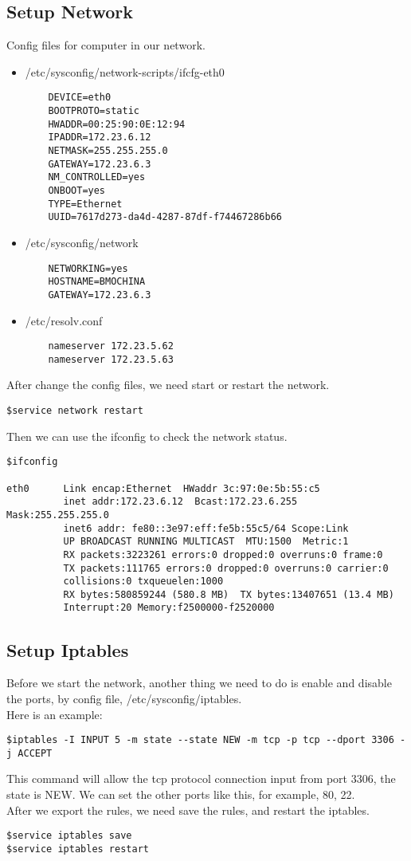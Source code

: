 \documentclass{article}
\begin{document}
\subsection{Setup Network}
Config files for computer in our network.
\begin{itemize}
    \item
    /etc/sysconfig/network-scripts/ifcfg-eth0
    \begin{lstlisting}
    DEVICE=eth0
    BOOTPROTO=static
    HWADDR=00:25:90:0E:12:94
    IPADDR=172.23.6.12
    NETMASK=255.255.255.0
    GATEWAY=172.23.6.3
    NM_CONTROLLED=yes
    ONBOOT=yes
    TYPE=Ethernet
    UUID=7617d273-da4d-4287-87df-f74467286b66
    \end{lstlisting}
    \item
    /etc/sysconfig/network
    \begin{lstlisting}
    NETWORKING=yes
    HOSTNAME=BMOCHINA
    GATEWAY=172.23.6.3
    \end{lstlisting}
    \item
    /etc/resolv.conf
    \begin{lstlisting}
    nameserver 172.23.5.62
    nameserver 172.23.5.63
    \end{lstlisting}
\end{itemize}
After change the config files, we need start or restart the network.
\begin{lstlisting}
$service network restart
\end{lstlisting}
Then we can use the ifconfig to check the network status.
\begin{lstlisting}
$ifconfig

eth0      Link encap:Ethernet  HWaddr 3c:97:0e:5b:55:c5  
          inet addr:172.23.6.12  Bcast:172.23.6.255  Mask:255.255.255.0
          inet6 addr: fe80::3e97:eff:fe5b:55c5/64 Scope:Link
          UP BROADCAST RUNNING MULTICAST  MTU:1500  Metric:1
          RX packets:3223261 errors:0 dropped:0 overruns:0 frame:0
          TX packets:111765 errors:0 dropped:0 overruns:0 carrier:0
          collisions:0 txqueuelen:1000 
          RX bytes:580859244 (580.8 MB)  TX bytes:13407651 (13.4 MB)
          Interrupt:20 Memory:f2500000-f2520000 
\end{lstlisting}

\subsection{Setup Iptables}
Before we start the network, another thing we need to do is enable and disable the ports, by config file, /etc/sysconfig/iptables.\\
Here is an example:
\begin{lstlisting}
$iptables -I INPUT 5 -m state --state NEW -m tcp -p tcp --dport 3306 -j ACCEPT
\end{lstlisting}
This command will allow the tcp protocol connection input from port 3306, the state is NEW.
We can set the other ports like this, for example, 80, 22.\\
After we export the rules, we need save the rules, and restart the iptables.
\begin{lstlisting}
$service iptables save 
$service iptables restart 
\end{lstlisting}
\end{document}
